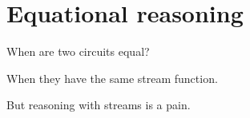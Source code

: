 \section{Equational reasoning}

\begin{frame}
    \frametitle{Extensional eq\}

    

\end{frame}
When are two circuits equal?

\pause

When they have the same stream function.

\pause

But reasoning with streams is a \alert{pain}.